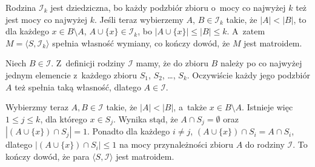 
\exercise %
Rodzina $\mathcal{I}_k$ jest dziedziczna, bo każdy podzbiór zbioru o~mocy co najwyżej $k$ też jest mocy co najwyżej $k$.
Jeśli teraz wybierzemy $A$, $B\in\mathcal{I}_k$ takie, że $|A|<|B|$, to dla każdego $x\in B\setminus A$, $A\cup\{x\}\in\mathcal{I}_k$, bo $|A\cup\{x\}|\le|B|\le k$.
A~zatem $M=\langle S,\mathcal{I}_k\rangle$ spełnia własność wymiany, co kończy dowód, że $M$ jest matroidem.

\exercise %
\exercise %
\exercise %
Niech $B\in\mathcal{I}$.
Z~definicji rodziny $\mathcal{I}$ mamy, że do zbioru $B$ należy po co najwyżej jednym elemencie z~każdego zbioru $S_1$, $S_2$, \dots, $S_k$.
Oczywiście każdy jego podzbiór $A$ też spełnia taką własność, dlatego $A\in\mathcal{I}$.

Wybierzmy teraz $A,B\in\mathcal{I}$ takie, że $|A|<|B|$, a~także $x\in B\setminus A$.
Istnieje więc $1\le j\le k$, dla którego $x\in S_j$.
Wynika stąd, że $A\cap S_j=\emptyset$ oraz $|(A\cup\{x\})\cap S_j|=1$.
Ponadto dla każdego $i\ne j$, $(A\cup\{x\})\cap S_i=A\cap S_i$, dlatego $|(A\cup\{x\})\cap S_i|\le1$ na mocy przynależności zbioru $A$ do rodziny $\mathcal{I}$.
To kończy dowód, że para $\langle S,\mathcal{I}\rangle$ jest matroidem.

\exercise %
